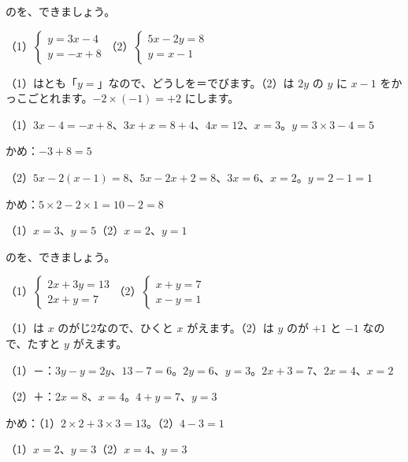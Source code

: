 \begin{reidai}
のを、できましょう。\par
（1）\nobreak $\begin{cases} y=3x-4\\ y=-x+8 \end{cases}$\qquad（2）\nobreak $\begin{cases} 5x-2y=8\\ y=x-1 \end{cases}$\par
\kangaekata （1）はとも「$y=$」なので、どうしを＝でびます。（2）は $2y$ の $y$ に $x-1$ をかっこごとれます。$-2\times(-1)=+2$ にします。\par
\shiki（1）\nobreak $3x-4=-x+8$、$3x+x=8+4$、$4x=12$、$x=3$。$y=3\times3-4=5$\par
\hspace*{2.6\zw}\phantom{（1）}かめ：$-3+8=5$\par
\hspace*{2.6\zw}（2）\nobreak $5x-2(x-1)=8$、$5x-2x+2=8$、$3x=6$、$x=2$。$y=2-1=1$\par
\hspace*{2.6\zw}\phantom{（2）}かめ：$5\times2-2\times1=10-2=8$\par
\kotae（1）\nobreak $x=3$、$y=5$\quad（2）\nobreak $x=2$、$y=1$
\end{reidai}

\begin{reidai}
のを、できましょう。\par
（1）\nobreak $\begin{cases} 2x+3y=13\\ 2x+y=7 \end{cases}$\qquad（2）\nobreak $\begin{cases} x+y=7\\ x-y=1 \end{cases}$\par
\kangaekata （1）は $x$ のがじ2なので、ひくと $x$ がえます。（2）は $y$ のが $+1$ と $-1$ なので、たすと $y$ がえます。\par
\shiki（1）\nobreak {}－：$3y-y=2y$、$13-7=6$。$2y=6$、$y=3$。$2x+3=7$、$2x=4$、$x=2$\par
\hspace*{2.6\zw}（2）\nobreak {}＋：$2x=8$、$x=4$。$4+y=7$、$y=3$\par
\hspace*{2.6\zw}かめ：（1）$2\times2+3\times3=13$。（2）$4-3=1$\par
\kotae（1）\nobreak $x=2$、$y=3$\quad（2）\nobreak $x=4$、$y=3$
\end{reidai}

